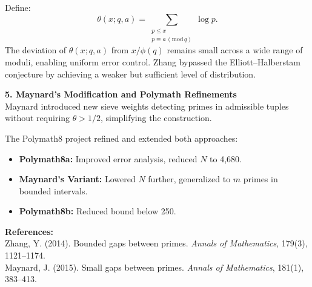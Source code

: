 \begin{technical}
Define:
\[
\theta(x; q, a) = \sum_{\substack{p \le x \\ p \equiv a \,(\mathrm{mod}\,q)}} \log p.
\]
The deviation of \( \theta(x; q, a) \) from \( x / \phi(q) \) remains small across a wide range of moduli, enabling uniform error control. Zhang bypassed the Elliott–Halberstam conjecture by achieving a weaker but sufficient level of distribution.

\vspace{0.7em}
\textbf{5. Maynard’s Modification and Polymath Refinements}\\[0.5em]
Maynard introduced new sieve weights detecting primes in admissible tuples without requiring \( \theta > 1/2 \), simplifying the construction.

The Polymath8 project refined and extended both approaches:
\begin{itemize}[leftmargin=*]
    \item \textbf{Polymath8a:} Improved error analysis, reduced \( N \) to 4,680.
    \item \textbf{Maynard's Variant:} Lowered \( N \) further, generalized to \( m \) primes in bounded intervals.
    \item \textbf{Polymath8b:} Reduced bound below 250.
\end{itemize}

\vspace{0.5em}
\textbf{References:}\\[0.3em]
{\footnotesize
Zhang, Y. (2014). Bounded gaps between primes. \textit{Annals of Mathematics}, 179(3), 1121–1174.\\
Maynard, J. (2015). Small gaps between primes. \textit{Annals of Mathematics}, 181(1), 383–413.
}

\end{technical}
